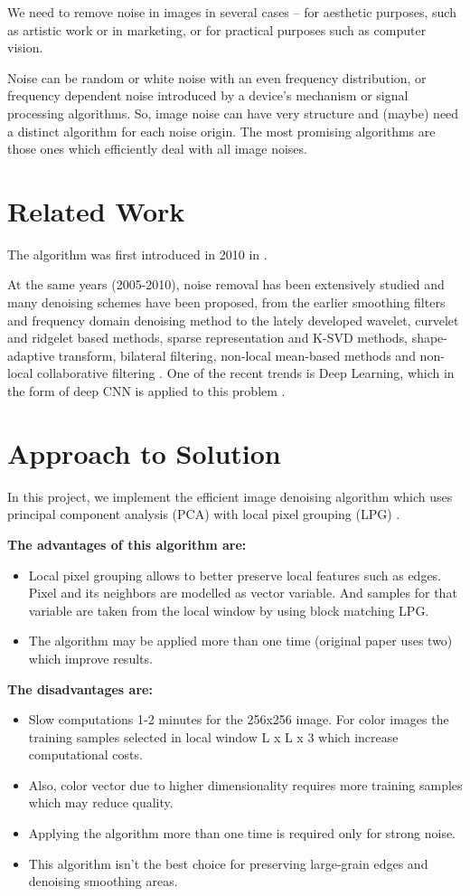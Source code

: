 We need to remove noise in images in several cases – for aesthetic purposes, such as artistic work or in marketing, or for practical purposes such as computer vision.  

Noise can be random or white noise with an even frequency distribution, or frequency dependent noise introduced by a device's mechanism or signal processing algorithms. So, image noise can have very structure and (maybe) need a distinct algorithm for each noise origin. The most promising algorithms are those ones which efficiently deal with all image noises. 

\section{Related Work}
The algorithm was first introduced in 2010 in \cite{zhang2010two}.  

At the same years (2005-2010), noise removal has been extensively studied and many denoising schemes have been proposed, from the earlier smoothing filters and frequency domain denoising method to the lately developed wavelet, curvelet and ridgelet based methods, sparse representation and K-SVD methods, shape-adaptive transform, bilateral filtering, non-local mean-based methods and non-local collaborative filtering \cite{zhang2010two}. One of the recent trends is Deep Learning, which in the form of deep CNN is applied to this problem \cite{zhang2017beyond}. 

\section{Approach to Solution}
In this project, we implement the efficient image denoising algorithm which uses principal component analysis (PCA) with local pixel grouping (LPG) \cite{zhang2010two}. 

\textbf{The advantages of this algorithm are:}
\begin{itemize}
    \item Local pixel grouping allows to better preserve local features such as edges. Pixel and its neighbors are modelled as vector variable. And samples for that variable are taken from the local window by using block matching LPG. 
    \item The algorithm may be applied more than one time (original paper uses two) which improve results. 
\end{itemize}

\textbf{The disadvantages are:}
\begin{itemize}
    \item Slow computations 1-2 minutes for the 256x256 image. For color images the training samples selected in local window L x L x 3 which increase computational costs.
    \item Also, color vector due to higher dimensionality requires more training samples which may reduce quality. 
    \item Applying the algorithm more than one time is required only for strong noise. 
    \item This algorithm isn’t the best choice for preserving large-grain edges and denoising smoothing areas. 
\end{itemize}

